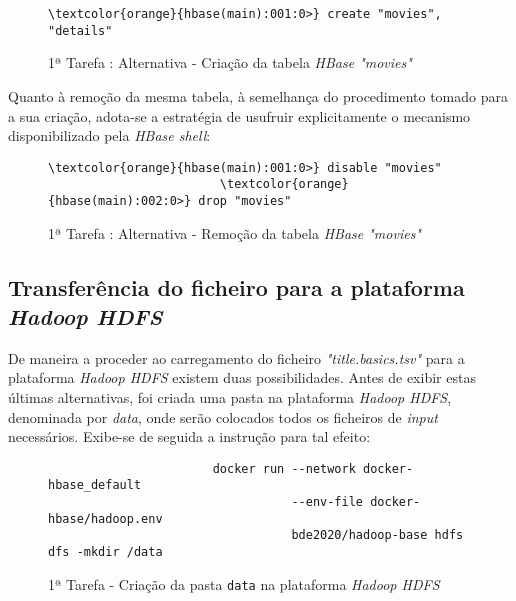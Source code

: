 \documentclass[a4paper]{report}
\begin{document}
{			\begin{figure}[H]
				{
					\color{teal}
					\begin{Verbatim}[commandchars=\\\{\}]
                  \textcolor{orange}{hbase(main):001:0>} create "movies", "details"
					\end{Verbatim}
				}
				\caption{1ª Tarefa : Alternativa - Criação da tabela \textit{HBase "movies"}}
				\label{fig:7}
			\end{figure}
			
			Quanto à remoção da mesma tabela, à semelhança do procedimento tomado para a sua criação, adota-se a estratégia de usufruir explicitamente o mecanismo disponibilizado pela \textit{HBase shell}:
			\begin{figure}[H]
				{
					\color{teal}
					\begin{Verbatim}[commandchars=\\\{\}]
                        \textcolor{orange}{hbase(main):001:0>} disable "movies"
                        \textcolor{orange}{hbase(main):002:0>} drop "movies"
					\end{Verbatim}
				}
				\caption{1ª Tarefa : Alternativa - Remoção da tabela \textit{HBase "movies"}}
				\label{fig:8}
			\end{figure}

		\subsection{Transferência do ficheiro para a plataforma \textit{Hadoop HDFS}} \label{subsec:Task1-2}
		De maneira a proceder ao carregamento do ficheiro \textit{"title.basics.tsv"} para a plataforma \textit{Hadoop HDFS} existem duas possibilidades.
		Antes de exibir estas últimas alternativas, foi criada uma pasta na plataforma \textit{Hadoop HDFS}, denominada por \textit{data}, onde serão colocados todos os ficheiros de \textit{input} necessários.
		Exibe-se de seguida a instrução para tal efeito:
		\begin{figure}[H]
			{
				\color{teal}
				\begin{verbatim}
					   docker run --network docker-hbase_default
					              --env-file docker-hbase/hadoop.env
					              bde2020/hadoop-base hdfs dfs -mkdir /data
				\end{verbatim}
			}
			\caption{1ª Tarefa - Criação da pasta \texttt{data} na plataforma \textit{Hadoop HDFS}}
            \label{fig:9}
		\end{figure}

}
\end{document}
